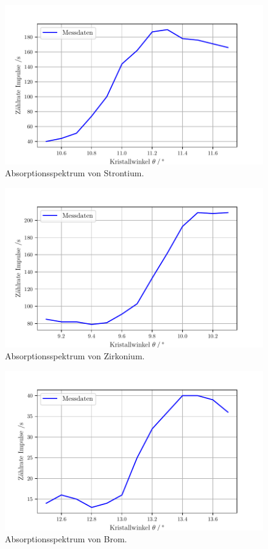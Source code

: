\begin{figure}[H]
  \centering
  \includegraphics[width=\textwidth]{build/plot4.pdf}
  \caption{Absorptionsspektrum von Strontium.}
  \label{fig:plot4}
\end{figure}

\begin{figure}[H]
  \centering
  \includegraphics[width=\textwidth]{build/plot5.pdf}
  \caption{Absorptionsspektrum von Zirkonium.}
  \label{fig:plot5}
\end{figure}

\begin{figure}[H]
  \centering
  \includegraphics[width=\textwidth]{build/plot6.pdf}
  \caption{Absorptionsspektrum von Brom.}
  \label{fig:plot6}
\end{figure}


